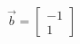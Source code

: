 \documentclass[preview]{standalone}
\begin{document}
\begin{align*}
\vec{b} = \begin{bmatrix} -1 \\ 1 \end{bmatrix}
\end{align*}
\end{document}
